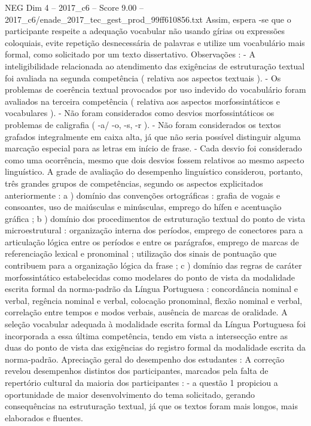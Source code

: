\begin{textsample}{NEG Dim 4 – 2017\_c6 – Score 9.00 – 2017\_c6/enade\_2017\_tec\_gest\_prod\_99ff610856.txt}
Assim, espera -se que o participante respeite a adequação vocabular não usando gírias ou expressões coloquiais, evite repetição desnecessária de palavras e utilize um vocabulário mais formal, como solicitado por um texto dissertativo.
Observações : - A inteligibilidade relacionada ao atendimento das exigências de estruturação textual foi avaliada na segunda competência ( relativa aos aspectos textuais ). - Os problemas de coerência textual provocados por uso indevido do vocabulário foram avaliados na terceira competência ( relativa aos aspectos morfossintáticos e vocabulares ). - Não foram considerados como desvios morfossintáticos os problemas de caligrafia ( -a/ -o, -s, -r ). - Não foram considerados os textos grafados integralmente em caixa alta, já que não seria possível distinguir alguma marcação especial para as letras em início de frase. - Cada desvio foi considerado como uma ocorrência, mesmo que dois desvios fossem relativos ao mesmo aspecto linguístico.
A grade de avaliação do desempenho linguístico considerou, portanto, três grandes grupos de competências, segundo os aspectos explicitados anteriormente : a ) domínio das convenções ortográficas : grafia de vogais e consoantes, uso de maiúsculas e minúsculas, emprego do hífen e acentuação gráfica ; b ) domínio dos procedimentos de estruturação textual do ponto de vista microestrutural : organização interna dos períodos, emprego de conectores para a articulação lógica entre os períodos e entre os parágrafos, emprego de marcas de referenciação lexical e pronominal ; utilização dos sinais de pontuação que contribuem para a organização lógica da frase ; c ) domínio das regras de caráter morfossintático estabelecidas como modelares do ponto de vista da modalidade escrita formal da norma-padrão da Língua Portuguesa : concordância nominal e verbal, regência nominal e verbal, colocação pronominal, flexão nominal e verbal, correlação entre tempos e modos verbais, ausência de marcas de oralidade.
A seleção vocabular adequada à modalidade escrita formal da Língua Portuguesa foi incorporada a essa última competência, tendo em vista a intersecção entre as duas do ponto de vista das exigências do registro formal da modalidade escrita da norma-padrão.
Apreciação geral do desempenho dos estudantes : A correção revelou desempenhos distintos dos participantes, marcados pela falta de repertório cultural da maioria dos participantes : - a questão 1 propiciou a oportunidade de maior desenvolvimento do tema solicitado, gerando consequências na estruturação textual, já que os textos foram mais longos, mais elaborados e fluentes.

\end{textsample}
